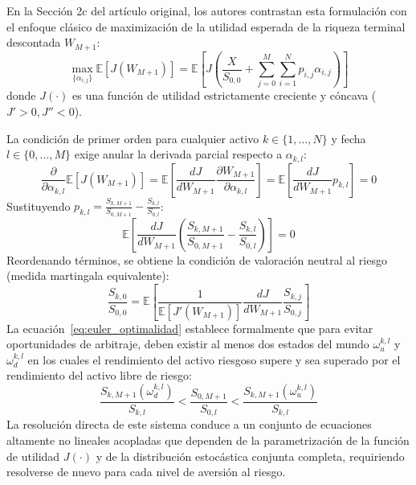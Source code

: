 \documentclass[11pt,a4paper]{report}
\numberwithin{equation}{chapter}
\begin{document}
En la Sección 2c del artículo original, los autores contrastan esta formulación con el enfoque clásico de maximización de la utilidad esperada de la riqueza terminal descontada $W_{M+1}$:
\begin{equation}
    \max_{\{\alpha_{i,j}\}} \mathbb{E}\left[ J(W_{M+1}) \right] = \mathbb{E}\left[ J\left( \frac{X}{S_{0,0}} + \sum_{j=0}^M \sum_{i=1}^N p_{i,j} \alpha_{i,j} \right) \right]
\end{equation}
donde $J(\cdot)$ es una función de utilidad estrictamente creciente y cóncava ($J' > 0, J'' < 0$).

La condición de primer orden para cualquier activo $k \in \{1,\dots,N\}$ y fecha $l \in \{0,\dots,M\}$ exige anular la derivada parcial respecto a $\alpha_{k,l}$:
\begin{equation}
    \frac{\partial}{\partial \alpha_{k,l}} \mathbb{E}[J(W_{M+1})] = \mathbb{E}\left[ \frac{dJ}{dW_{M+1}} \frac{\partial W_{M+1}}{\partial \alpha_{k,l}} \right] = \mathbb{E}\left[ \frac{dJ}{dW_{M+1}} p_{k,l} \right] = 0
\end{equation}
Sustituyendo $p_{k,l} = \frac{S_{k,M+1}}{S_{0,M+1}} - \frac{S_{k,l}}{S_{0,l}}$:
\begin{equation}
    \mathbb{E}\left[ \frac{dJ}{dW_{M+1}} \left( \frac{S_{k,M+1}}{S_{0,M+1}} - \frac{S_{k,l}}{S_{0,l}} \right) \right] = 0 \label{eq:euler_optimalidad}
\end{equation}
Reordenando términos, se obtiene la condición de valoración neutral al riesgo (medida martingala equivalente):
\begin{equation}
    \frac{S_{k,0}}{S_{0,0}} = \mathbb{E}\left[ \frac{1}{\mathbb{E}[J'(W_{M+1})]} \frac{dJ}{dW_{M+1}} \frac{S_{k,j}}{S_{0,j}} \right]
\end{equation}
La ecuación~\eqref{eq:euler_optimalidad} establece formalmente que para evitar oportunidades de arbitraje, deben existir al menos dos estados del mundo $\omega_u^{k,l}$ y $\omega_d^{k,l}$ en los cuales el rendimiento del activo riesgoso supere y sea superado por el rendimiento del activo libre de riesgo:
\begin{equation}
    \frac{S_{k,M+1}(\omega_d^{k,l})}{S_{k,l}} < \frac{S_{0,M+1}}{S_{0,l}} < \frac{S_{k,M+1}(\omega_u^{k,l})}{S_{k,l}}
\end{equation}
La resolución directa de este sistema conduce a un conjunto de ecuaciones altamente no lineales acopladas que dependen de la parametrización de la función de utilidad $J(\cdot)$ y de la distribución estocástica conjunta completa, requiriendo resolverse de nuevo para cada nivel de aversión al riesgo. 
\end{document}
